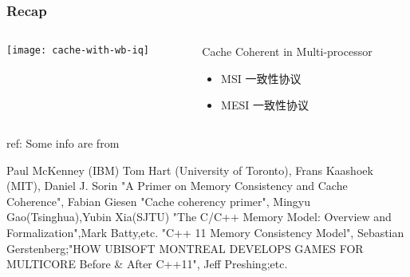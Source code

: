 %
%
\begin{frame}[plain]
	\frametitle{Recap }
	
	
	
	\begin{columns}
		
		\begin{column}{.5\textwidth}
			\centering
			
			\texttt{[image: cache-with-wb-iq]}

		\end{column}
		
		\begin{column}{.5\textwidth}
			
			\Large
            Cache Coherent in Multi-processor
			\begin{itemize}
				\item  MSI 一致性协议
				\item MESI 一致性协议
			
			\end{itemize}
			
		\end{column}
		
		
	\end{columns}
	
\tiny ref:
Some info are from

Paul McKenney (IBM) Tom Hart (University of Toronto), Frans Kaashoek (MIT), 
Daniel J. Sorin "A Primer on Memory Consistency and Cache Coherence", Fabian Giesen "Cache coherency primer", Mingyu Gao(Tsinghua),Yubin Xia(SJTU)
"The C/C++ Memory Model: Overview and Formalization",Mark Batty,etc. "C++ 11 Memory Consistency Model", Sebastian Gerstenberg;"HOW UBISOFT MONTREAL
DEVELOPS GAMES FOR MULTICORE Before \& After C++11", Jeff Preshing;etc.

	
\end{frame}
